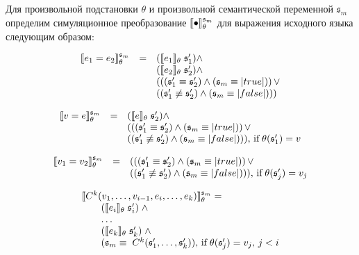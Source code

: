 \begin{definition}
\normalfont Для произвольной подстановки $\theta$ и произвольной семантической переменной ${\mathfrak s}_m$ определим симуляционное преобразование $\llbracket{\bullet}\rrbracket^{{\mathfrak s}_m}_\theta$ для выражения исходного языка следующим образом:

$$
\begin{array}{rcl}
\sembr{e_1 = e_2}^{{\mathfrak s}_m}_\theta&=& (\sembr{e_1}_\theta\; {\mathfrak s}^\prime_1) \wedge \\
                           & & (\sembr{e_2}_\theta\; {\mathfrak s}^\prime_2) \wedge \\
                           & & ((({\mathfrak s}^\prime_1 \equiv {\mathfrak s}^\prime_2) \wedge ({\mathfrak s}_m \equiv \lstinline|true|))\, \vee \\ 
                           & & (({\mathfrak s}^\prime_1 \not \equiv {\mathfrak s}^\prime_2) \wedge ({\mathfrak s}_m \equiv \lstinline|false|)))
\end{array}
$$

$$
\begin{array}{rcl}
\sembr{v = e}^{{\mathfrak s}_m}_\theta&=& (\sembr{e}_\theta\; {\mathfrak s}^\prime_2) \wedge \\
                        & & ((({\mathfrak s}^\prime_1 \equiv {\mathfrak s}^\prime_2) \wedge ({\mathfrak s}_m \equiv \lstinline|true|))\, \vee \\ 
                        & & (({\mathfrak s}^\prime_1 \not \equiv {\mathfrak s}^\prime_2) \wedge ({\mathfrak s}_m \equiv \lstinline|false|))),\,\mbox{if}\;\theta({\mathfrak s}^\prime_1)=v
\end{array}
$$

$$
\begin{array}{rcl}
\sembr{v_1 = v_2}^{{\mathfrak s}_m}_\theta&=& ((({\mathfrak s}^\prime_1 \equiv {\mathfrak s}^\prime_2) \wedge ({\mathfrak s}_m \equiv \lstinline|true|))\, \vee \\ 
                           & & (({\mathfrak s}^\prime_1 \not \equiv {\mathfrak s}^\prime_2) \wedge ({\mathfrak s}_m \equiv \lstinline|false|))),\,\mbox{if}\;\theta({\mathfrak s}^\prime_j)=v_j
\end{array}
$$

$$ 
\begin{array}{l}
\llbracket{C^k(v_1, \ldots, v_{i-1}, e_i, \ldots, e_k)}\rrbracket^{{\mathfrak s}_m}_\theta=\\
\qquad(\llbracket{e_i}\rrbracket_\theta \; {\mathfrak s}^\prime_i) \; \wedge \\
\qquad\ldots  \\
\qquad(\llbracket{e_k}\rrbracket_\theta \; {\mathfrak s}^\prime_k) \; \wedge \\
\qquad({\mathfrak s}_m \equiv\; C^k({\mathfrak s}^\prime_1, \ldots, {\mathfrak s}^\prime_k)),\,\mbox{if}\;\theta({\mathfrak s}^\prime_j)=v_j,\,j<i
\end{array}
$$


\end{definition}
